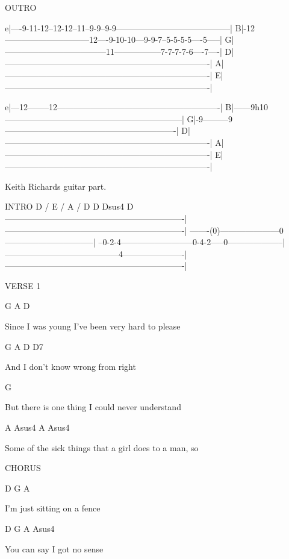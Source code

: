 OUTRO

e|----9-11-12--12-12--11--9-9--9-9-----------------------------------------|
B|-12------------------------------12----9-10-10---9-9-7--5-5-5-5----5-----|
G|------------------------------------11-----------------7-7-7-7-6----7----|
D|-------------------------------------------------------------------------|
A|-------------------------------------------------------------------------|
E|-------------------------------------------------------------------------|

e|---12--------12----------------------------------------------------------|
B|------9h10---------------------------------------------------------------|
G|-9---------9-------------------------------------------------------------|
D|-------------------------------------------------------------------------|
A|-------------------------------------------------------------------------|
E|-------------------------------------------------------------------------|


Keith Richards guitar part.

INTRO
            D  /  E  / A / D                  D    Dsus4   D
----------------------------------------------------------------|
----------------------------------------------------------------|
-------(0)---------------------0--------------------------------|
--0-2-4--------------------------0-4-2-----0--------------------|
-----------------------------------------4----------------------|
----------------------------------------------------------------|

VERSE 1

G            A                           D

Since I was young I've been very hard to please

G           A               D        D7

And I don't know wrong from right

G

But there is one thing I could never understand

A           Asus4               A              Asus4

Some of the sick things that a girl does to a man, so


CHORUS

D        G            A

I'm just sitting on a fence

D       G            A       Asus4

You can say I got no sense

